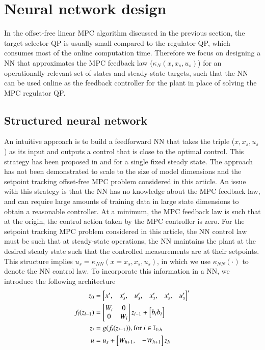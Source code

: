 \documentclass[preprint,5p, twocolumn, authoryear]{elsarticle}
\begin{document}
\section{Neural network design} \label{sec:controller_design}

In the offset-free linear MPC algorithm discussed in the previous section, the
target selector QP is usually small compared to the regulator QP, which consumes
most of the online computation time. Therefore we focus on designing a NN that
approximates the MPC feedback law ($\kappa_N(x, x_s, u_s)$) for an operationally
relevant set of states and steady-state targets, such that the NN can be used
online as the feedback controller for the plant in place of solving the MPC
regulator QP.

\subsection{Structured neural network}
An intuitive approach is to build a feedforward NN that takes the triple ($x,
x_s, u_s$) as its input and outputs a control that is close to the optimal
control. This strategy has been proposed in \cite*{karg:lucia:2020} and 
\cite*{chen:saulnier:atanasov:lee:kumar:pappas:morari:2018}
for a single fixed steady state. The approach has not been demonstrated to scale
to the size of model dimensions and the setpoint tracking offset-free MPC
problem considered in this article. An issue with this strategy is that the NN
has no knowledge about the MPC feedback law, and can require large amounts of
training data in large state dimensions to obtain a reasonable controller. At a
minimum, the MPC feedback law is such that at the origin, the control action
taken by the MPC controller is zero. For the setpoint tracking MPC problem
considered in this article, the NN control law must be such that at steady-state
operations, the NN maintains the plant at the desired steady state such that the
controlled measurements are at their setpoints. This structure implies $u_s =
\kappa_{NN}(x = x_s, x_s, u_s)$, in which we use $\kappa_{NN}(\cdot)$ to denote
the NN control law. To incorporate this information in a NN, we introduce the
following architecture
\begin{align}
z_0 &= \begin{bmatrix}
    x', & x_s', & u_s', & x_s', & x_s', & u_s' \end{bmatrix}'\notag \\
    f_i(z_{i-1}) &= \begin{bmatrix}
        W_i & 0 \notag \\
        0 & W_i
          \end{bmatrix}z_{i-1}  + \begin{bmatrix}
            b_i \notag 
            b_i
            \end{bmatrix} \notag\\
    z_i &= g(f_i(z_{i-1})), \textnormal{for} \ i \in \mathbb{I}_{1:h} \notag \\
    u &= u_s + \begin{bmatrix}
  W_{h + 1}, & -W_{h + 1} \\
    \end{bmatrix} z_h
\label{eq:NNstruct}
\end{align}
\end{document}
